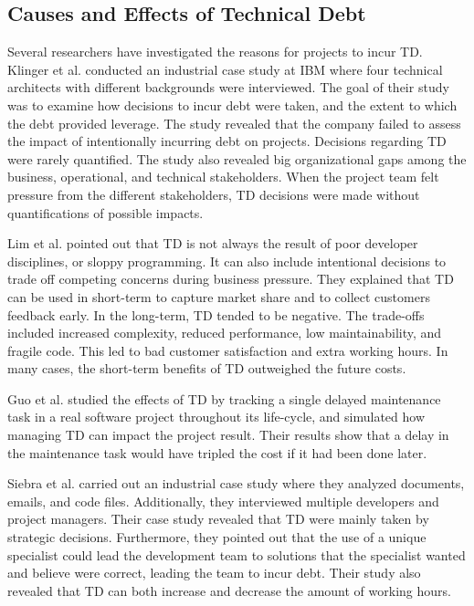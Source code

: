 \subsection{Causes and Effects of Technical Debt}
Several researchers have investigated the reasons for projects to incur TD. Klinger et al.\cite{p35-klinger} conducted an industrial case study at IBM where four technical architects with different backgrounds were interviewed. The goal of their study was to examine how decisions to incur debt were taken, and the extent to which the debt provided leverage\cite{p35-klinger}. The study revealed that the company failed to assess the impact of intentionally incurring debt on projects. Decisions regarding TD were rarely quantified. The study also revealed big organizational gaps among the business, operational, and technical stakeholders. When the project team felt pressure from the different stakeholders, TD decisions were made without quantifications of possible impacts.

Lim et al.\cite{lim-taksande} pointed out that TD is not always the result of poor developer disciplines, or sloppy programming. It can also include intentional decisions to trade off competing concerns during business pressure. They explained that TD can be used in short-term to capture market share and to collect customers feedback early. In the long-term, TD tended to be negative. The trade-offs included increased complexity, reduced performance, low maintainability, and fragile code. This led to bad customer satisfaction and extra working hours. In many cases, the short-term benefits of TD outweighed the future costs.

Guo et al.\cite{guo2011tracking} studied the effects of TD by tracking a single delayed maintenance task in a real software project throughout its life-cycle, and simulated how managing TD can impact the project result. Their results show that a delay in the maintenance task would have tripled the cost if it had been done later.

Siebra et al.\cite{p247-siebra} carried out an industrial case study where they analyzed documents, emails, and code files. Additionally, they interviewed multiple developers and project managers. Their case study revealed that TD were mainly taken by strategic decisions. Furthermore, they pointed out that the use of a unique specialist could lead the development team to solutions that the specialist wanted and believe were correct, leading the team to incur debt. Their study also revealed that TD can both increase and decrease the amount of working hours.

